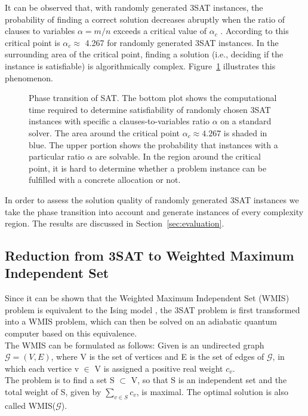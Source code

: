 It can be observed that, with randomly generated 3SAT instances, the probability of finding a correct solution decreases abruptly when the ratio of clauses to variables $\alpha = m/n$ exceeds a critical value of $\alpha_{c}$ \cite{monasson1996entropy}. According to \cite{mezard2002random} this critical point is $\alpha_{c} \approx $ 4.267 for randomly generated 3SAT instances. In the surrounding area of the critical point, finding a solution (i.e., deciding if the instance is satisfiable) is algorithmically complex. Figure~\ref{fig:crit_sat} illustrates this phenomenon.


\begin{figure}
	\centering
	
	\caption{Phase transition of SAT. The bottom plot shows the computational time required to determine satisfiability of randomly chosen 3SAT instances with specific a clauses-to-variables ratio $\alpha$ on a standard solver. The area around the critical point $\alpha_{c} \approx 4.267$ is shaded in blue.\newline
          The upper portion shows the probability that instances with a particular ratio $\alpha$ are solvable. In the region around the critical point, it is hard to determine whether a problem instance can be fulfilled with a concrete allocation or not.} \label{fig:crit_sat} \end{figure}

In order to assess the solution quality of randomly generated 3SAT instances we take the phase transition into account
and generate instances of every complexity region. The results are discussed in Section~\ref{sec:evaluation}.

\subsection{Reduction from 3SAT to Weighted Maximum Independent Set}
Since it can be shown that the Weighted Maximum Independent Set (WMIS) problem is equivalent to the Ising model \cite{choi2008minor}, the 3SAT problem is first transformed into a WMIS problem, which can then be solved on an adiabatic quantum computer based on this equivalence.\\

The WMIS can be formulated as follows: Given is an undirected graph $\mathcal{G} = (V, E)$, where V is the set of vertices and E is the set of edges of $\mathcal{G}$, in which each vertice v $\in$ V is assigned a positive real weight $c_{v}$.\\
The problem is to find a set S $\subset$ V, so that S is an independent set and the total weight of S, given by $\sum_{v \in S} c_{v}$, is maximal. The optimal solution is also called WMIS($\mathcal{G}$).

